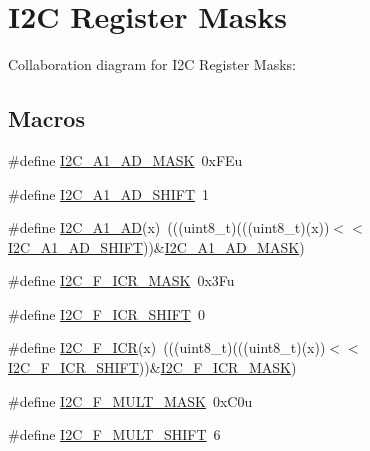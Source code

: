 \hypertarget{group___i2_c___register___masks}{}\section{I2C Register Masks}
\label{group___i2_c___register___masks}
Collaboration diagram for I2C Register Masks\+:
\subsection*{Macros}
\begin{DoxyCompactItemize}
\item 
\#define \hyperlink{group___i2_c___register___masks_gad90fbd42f33b89ff3296c52700771b1b}{I2\+C\+\_\+\+A1\+\_\+\+A\+D\+\_\+\+M\+A\+SK}~0x\+F\+Eu
\item 
\#define \hyperlink{group___i2_c___register___masks_gaf074658893634b95a9858ee29bbdd88a}{I2\+C\+\_\+\+A1\+\_\+\+A\+D\+\_\+\+S\+H\+I\+FT}~1
\item 
\#define \hyperlink{group___i2_c___register___masks_ga5248771248d1964b566ca3de1cadf6a3}{I2\+C\+\_\+\+A1\+\_\+\+AD}(x)~(((uint8\+\_\+t)(((uint8\+\_\+t)(x))$<$$<$\hyperlink{group___i2_c___register___masks_gaf074658893634b95a9858ee29bbdd88a}{I2\+C\+\_\+\+A1\+\_\+\+A\+D\+\_\+\+S\+H\+I\+FT}))\&\hyperlink{group___i2_c___register___masks_gad90fbd42f33b89ff3296c52700771b1b}{I2\+C\+\_\+\+A1\+\_\+\+A\+D\+\_\+\+M\+A\+SK})
\item 
\#define \hyperlink{group___i2_c___register___masks_gaeb777a93b5695409902fb2f2b77eb760}{I2\+C\+\_\+\+F\+\_\+\+I\+C\+R\+\_\+\+M\+A\+SK}~0x3\+Fu
\item 
\#define \hyperlink{group___i2_c___register___masks_ga8e2daf0de75e77e33467f6b132be0c30}{I2\+C\+\_\+\+F\+\_\+\+I\+C\+R\+\_\+\+S\+H\+I\+FT}~0
\item 
\#define \hyperlink{group___i2_c___register___masks_ga18089fd1cbe1936b133d50d580d39e6d}{I2\+C\+\_\+\+F\+\_\+\+I\+CR}(x)~(((uint8\+\_\+t)(((uint8\+\_\+t)(x))$<$$<$\hyperlink{group___i2_c___register___masks_ga8e2daf0de75e77e33467f6b132be0c30}{I2\+C\+\_\+\+F\+\_\+\+I\+C\+R\+\_\+\+S\+H\+I\+FT}))\&\hyperlink{group___i2_c___register___masks_gaeb777a93b5695409902fb2f2b77eb760}{I2\+C\+\_\+\+F\+\_\+\+I\+C\+R\+\_\+\+M\+A\+SK})
\item 
\#define \hyperlink{group___i2_c___register___masks_ga9e077caa9ac07c03f5e34e431d0806fa}{I2\+C\+\_\+\+F\+\_\+\+M\+U\+L\+T\+\_\+\+M\+A\+SK}~0x\+C0u
\item 
\#define \hyperlink{group___i2_c___register___masks_ga3a338cb3af4c140fde82427d091d5b4a}{I2\+C\+\_\+\+F\+\_\+\+M\+U\+L\+T\+\_\+\+S\+H\+I\+FT}~6

\end{DoxyCompactItemize}

